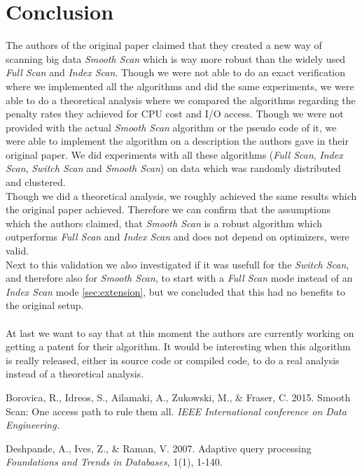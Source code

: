 \documentclass[a4paper,11pt,twoside]{article}
\begin{document}
\section{Conclusion}
The authors of the original paper claimed that they created a new way of scanning big data \textit{Smooth Scan} which is way more robust than the widely used \textit{Full Scan} and \textit{Index Scan}. Though we were not able to do an exact verification where we implemented all the algorithms and did the same experiments, we were able to do a theoretical analysis where we compared the algorithms regarding the penalty rates they achieved for CPU cost and I/O access. Though we were not provided with the actual \textit{Smooth Scan} algorithm or the pseudo code of it, we were able to implement the algorithm on a description the authors gave in their original paper. We did experiments with all these algorithms (\textit{Full Scan}, \textit{Index Scan}, \textit{Switch Scan} and \textit{Smooth Scan}) on data which was randomly distributed and clustered. \\
Though we did a theoretical analysis, we roughly achieved the same results which the original paper achieved. Therefore we can confirm that the assumptions which the authors claimed, that \textit{Smooth Scan} is a robust algorithm which outperforms \textit{Full Scan} and \textit{Index Scan} and does not depend on optimizers, were valid. \\
Next to this validation we also investigated if it was usefull for the \textit{Switch Scan}, and therefore also for \textit{Smooth Scan}, to start with a \textit{Full Scan} mode instead of an \textit{Index Scan} mode \autoref{sec:extension}, but we concluded that this had no benefits to the original setup. \\
\\
At last we want to say that at this moment the authors are currently working on getting a patent for their algorithm. It would be interesting when this algorithm is really released, either in source code or compiled code, to do a real analysis instead of a theoretical analysis.
\begin{thebibliography}{9}

	 Borovica, R., Idreos, S., Ailamaki, A., Zukowski, M., $\&$ Fraser, C.
	2015.	
 	Smooth Scan: One access path to rule them all.
	\emph{IEEE International conference on Data Engineering.}

	Deshpande, A., Ives, Z., $\&$ Raman, V.
	2007.
	Adaptive query processing
	\emph{Foundations and Trends in Databases,}
	1(1), 1-140.
\end{thebibliography}
\newpage
\end{document}

